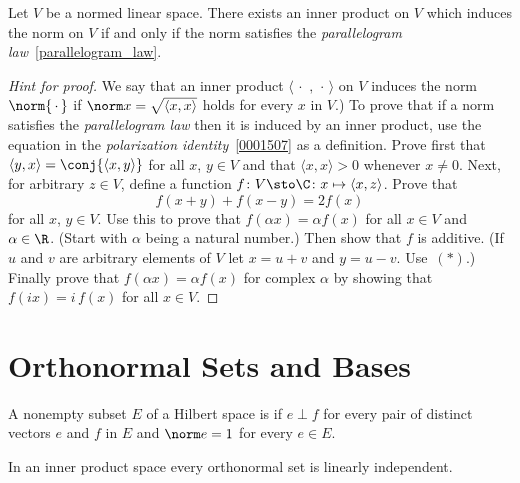 \begin{prop} Let $V$ be a normed linear space.  There exists an inner product on $V$ which induces the norm on $V$
if and only if the norm satisfies the \emph{parallelogram law}~\ref{parallelogram_law}.
\end{prop}

\begin{proof}[\emph{Hint for proof}]  We say that an inner product $\langle \,\cdot\,\,,\,\cdot\, \rangle$
on $V$ induces the norm $\norm{\,\cdot\,}$ if $\norm x = \sqrt{\langle x,x \rangle}$ holds for every $x$ in $V$.)
To prove that if a norm satisfies the \emph{parallelogram law} then it is induced by an inner product,
use the equation in the \emph{polarization identity}~\ref{0001507} as a definition.
Prove first that $\langle y,x \rangle = \conj{\langle x,y \rangle}$ for all $x$, $y\in V$ and that
$\langle x,x \rangle > 0$ whenever $x \ne 0$.  Next, for arbitrary $z \in V$, define a function
$f\colon V \sto \C\colon x \mapsto \langle x,z \rangle$.  Prove that
   \[ f(x + y) + f(x - y) = 2f(x) \tag{$\ast$} \]
for all $x$, $y \in V$.  Use this to prove that $f(\alpha x) = \alpha f(x)$ for all
$x \in V$ and $\alpha \in \R$.  (Start with $\alpha$ being a natural number.)  Then
show that $f$ is additive. (If $u$ and $v$ are arbitrary elements of $V$ let $x = u + v$
and $y = u - v$.  Use~$(\ast)$.)  Finally prove that $f(\alpha x) = \alpha f(x)$ for
complex $\alpha$ by showing that $f(ix) = i\,f(x)$ for all $x \in V$.  \ns
\end{proof}
















\section{Orthonormal Sets and Bases}\label{sec_onbases}
\begin{defn} A nonempty subset $E$ of a Hilbert space is
 if $e \perp f$ for every pair of distinct vectors $e$ and $f$ in $E$ and
$\norm e = 1$ for every $e \in E$.
\end{defn}

\begin{prop} In an inner product space every orthonormal set is linearly independent.
\end{prop}


